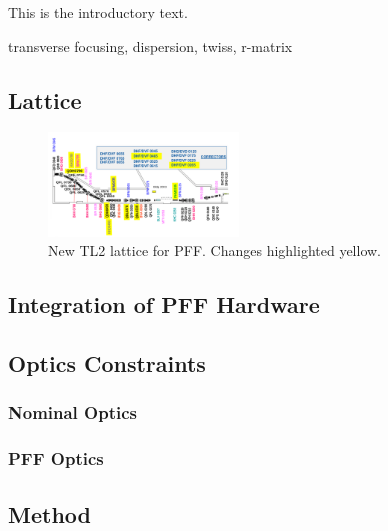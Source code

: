 
This is the introductory text.



transverse focusing, dispersion, twiss, r-matrix


\subsection{Lattice}
\label{ss:tl2Lattice}

\begin{figure}
  \centering
  \includegraphics[width=0.45\textwidth]{Figures/newTL2Lattice}
  \caption{New TL2 lattice for PFF. Changes highlighted yellow.}
  \label{f:newTL2Lattice}
\end{figure}

\subsection{Integration of PFF Hardware}
\label{ss:tl2PFFIntegration}

\subsection{Optics Constraints}
\label{ss:tl2OpticsReqs}

\subsubsection{Nominal Optics}
\label{sss:nominalOpticsReqs}

\subsubsection{PFF Optics}
\label{sss:pffOpticsReqs}


\subsection{Method}
\label{ss:opticsMethod}

